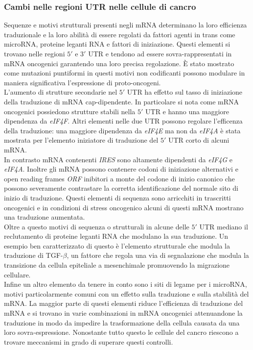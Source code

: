 		\subsubsection{Cambi nelle regioni UTR nelle cellule di cancro}
		\label{subsubsec:53UTRcomp}
		Sequenze e motivi strutturali presenti negli mRNA determinano la loro efficienza traduzionale e la loro abilit\`a di essere regolati da fattori agenti in trans come microRNA, proteine leganti RNA e fattori di iniziazione.
		Questi elementi si trovano nelle regioni $5'$ e $3'$ UTR e tendono ad essere sovra-rappresentati in mRNA oncogenici garantendo una loro precisa regolazione.
		\`E stato mostrato come mutazioni puntiformi in questi motivi non codificanti possono modulare in maniera significativa l'espressione di proto-oncogeni.\\
		L'aumento di strutture secondarie nel $5'$ UTR ha effetto sul tasso di iniziazione della traduzione di mRNA cap-dipendente.
		In particolare si nota come mRNA oncogenici possiedono strutture stabili nella $5'$ UTR e hanno una maggiore dipendenza da \emph{eIF4F}.
		Altri elementi nelle due UTR possono regolare l'efficenza della traduzione: una maggiore dipendenza da \emph{eIF4E} ma non da \emph{eIF4A} \`e stata mostrata per l'elemento iniziatore di traduzione del $5'$ UTR corto di alcuni mRNA.\\
		In contrasto mRNA contenenti \emph{IRES} sono altamente dipendenti da \emph{eIF4G} e \emph{eIF4A}.
		Inoltre gli mRNA possono contenere codoni di iniziazione alternativi e open reading frames \emph{ORF} inibitori a monte del codone di inizio canonico che possono severamente contrastare la corretta identificazione del normale sito di inizio di traduzione.
		Questi elementi di sequenza sono arricchiti in trascritti oncogenici e in condizioni di stress oncogenico alcuni di questi mRNA mostrano una traduzione aumentata.\\
		Oltre a questo motivi di sequenza o strutturali in alcune delle $5'$ UTR mediano il reclutamento di proteine leganti RNA che modulano la sua traduzione.
		Un esempio ben caratterizzato di questo \`e l'elemento strutturale che modula la traduzione di TGF-$\beta$, un fattore che regola una via di segnalazione che modula la transizione da cellula epiteliale a mesenchimale promuovendo la migrazione cellulare.\\
		Infine un altro elemento da tenere in conto sono i siti di legame per i microRNA, motivi particolarmente comuni con un effetto sulla traduzione e sulla stabilit\`a del mRNA.
		La maggior parte di questi elementi riduce l'efficienza di traduzione del mRNA e si trovano in varie combinazioni in mRNA oncogenici attenuandone la traduzione in modo da impedire la trasformazione della cellula causata da una loro sovra-espressione.
		Nonostante tutto questo le cellule del cancro riescono a trovare meccanismi in grado di superare questi controlli.\\

